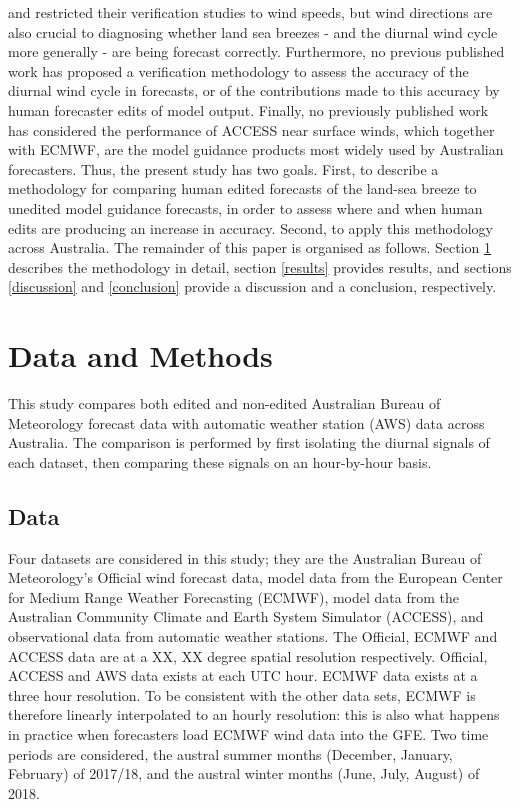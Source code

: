 \documentclass[alpha-refs]{wiley-article}
\begin{document}
\citet{pinson12} and \citet{lynch14} restricted their verification studies to wind speeds, but wind directions are also crucial to diagnosing whether land sea breezes - and the diurnal wind cycle more generally - are being forecast correctly. Furthermore, no previous published work has proposed a verification methodology to assess the accuracy of the diurnal wind cycle in forecasts, or of the contributions made to this accuracy by human forecaster edits of model output. Finally, no previously published work has considered the performance of ACCESS near surface winds, which together with ECMWF, are the model guidance products most widely used by Australian forecasters. Thus, the present study has two goals. First, to describe a methodology for comparing human edited forecasts of the land-sea breeze to unedited model guidance forecasts, in order to assess where and when human edits are producing an increase in accuracy. Second, to apply this methodology across Australia. The remainder of this paper is organised as follows. Section \ref{methods} describes the methodology in detail, section \ref{results} provides results, and sections \ref{discussion} and \ref{conclusion} provide a discussion and a conclusion, respectively.     

\section{Data and Methods} \label{methods}
This study compares both edited and non-edited Australian Bureau of Meteorology forecast data with automatic weather station (AWS) data across Australia. The comparison is performed by first isolating the diurnal signals of each dataset, then comparing these signals on an hour-by-hour basis. 

\subsection{Data} 
Four datasets are considered in this study; they are the Australian Bureau of Meteorology's Official wind forecast data, model data from the European Center for Medium Range Weather Forecasting (ECMWF), model data from the Australian Community Climate and Earth System Simulator (ACCESS), and observational data from automatic weather stations. The Official, ECMWF and ACCESS data are at a XX, XX degree spatial resolution respectively. Official, ACCESS and AWS data exists at each UTC hour. ECMWF data exists at a three hour resolution. To be consistent with the other data sets, ECMWF is therefore linearly interpolated to an hourly resolution: this is also what happens in practice when forecasters load ECMWF wind data into the GFE. Two time periods are considered, the austral summer months (December, January, February) of 2017/18, and the austral winter months (June, July, August) of 2018. 
\end{document}
